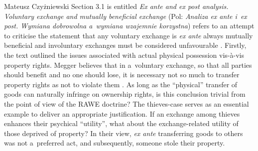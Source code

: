 \begin{newrevengenv}{Mateusz Czyżniewski}
Section 3.1 is entitled \textit{Ex ante and ex post analysis. Voluntary exchange and mutually beneficial exchange} (Pol: \textit{Analiza ex ante i~ex post. Wymiana dobrowolna a~wymiana wzajemnie korzystna}) refers to an attempt to criticise the statement that any voluntary exchange is \textit{ex ante} always mutually beneficial and involuntary exchanges must be considered unfavourable 
\parencite[][pp.59–73]{megger_sprawiedliwosc_2021}. %
 Firstly, the text outlined the issues associated with actual physical possession vis-à-vis property rights. Megger believes that in a~voluntary exchange, so that all parties should benefit and no one should lose, it is necessary not so much to transfer property rights as not to violate them 
\parencite[][p.59]{megger_sprawiedliwosc_2021}. %
 As long as the ``physical'' transfer of goods can naturally infringe on ownership rights, is this conclusion trivial from the point of view of the RAWE doctrine? The thieves-case serves as an essential example to deliver an appropriate justification. If an exchange among thieves enhances their psychical ``utility'', what about the exchange-related utility of those deprived of property? In their view, \textit{ex ante} transferring goods to others was not a~preferred act, and subsequently, someone stole their property.




\end{newrevengenv}
